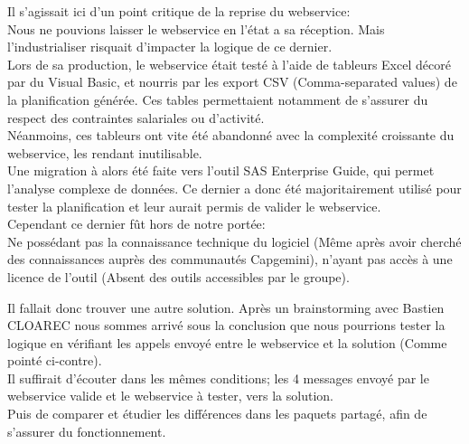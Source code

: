 \documentclass{rapport}
\begin{document}
Il s'agissait ici d'un point critique de la reprise du webservice:\\
Nous ne pouvions laisser le webservice en l'état a sa réception. Mais l'industrialiser risquait d'impacter la logique de ce dernier.\\

Lors de sa production, le webservice était testé à l'aide de tableurs Excel décoré par du Visual Basic, et nourris par les export CSV (Comma-separated values) de la planification générée. Ces tables permettaient notamment de s'assurer du respect des contraintes salariales ou d'activité.\\
Néanmoins, ces tableurs ont vite été abandonné avec la complexité croissante du webservice, les rendant inutilisable.\\
Une migration à alors été faite vers l'outil SAS Enterprise Guide, qui permet l'analyse complexe de données. Ce dernier a donc été majoritairement utilisé pour tester la planification et leur aurait permis de valider le webservice.\\
Cependant ce dernier fût hors de notre portée:\\
Ne possédant pas la connaissance technique du logiciel (Même après avoir cherché des connaissances auprès des communautés Capgemini), n'ayant pas accès à une licence de l'outil (Absent des outils accessibles par le groupe).\\

\begin{minipage}{0.35\textwidth}
Il fallait donc trouver une autre solution. Après un brainstorming avec Bastien CLOAREC nous sommes arrivé sous la conclusion que nous pourrions tester la logique en vérifiant les appels envoyé entre le webservice et la solution (Comme pointé ci-contre).\\

Il suffirait d'écouter dans les mêmes conditions; les 4 messages envoyé par le webservice valide et le webservice à tester, vers la solution.\\
Puis de comparer et étudier les différences dans les paquets partagé, afin de s'assurer du fonctionnement.\\
\end{minipage}
\begin{minipage}{0.55\textwidth}
\end{minipage}
\vspace{5mm} %
\\
\end{document}
